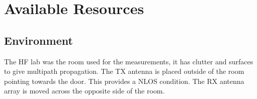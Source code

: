 








\chapter{Available Resources}
\section{Environment}
The HF lab was the room used for the measurements, it has  clutter and surfaces to give  multipath propagation. The TX antenna is placed outside of the room pointing towards the door. This provides a NLOS condition. The RX antenna array is moved across the opposite side of the room.

